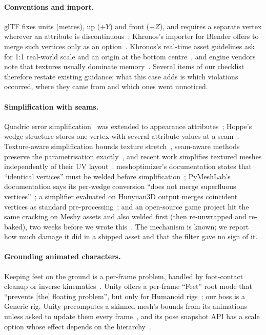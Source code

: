 \paragraph{Conventions and import.} glTF fixes units (metres), up ($+Y$) and front
($+Z$), and requires a separate vertex wherever an attribute is
discontinuous~\cite{khronos2021gltf}; Khronos's importer for Blender offers to
merge such vertices only as an option~\cite{khronos_blenderio}. Khronos's
real-time asset guidelines ask for 1:1 real-world scale and an origin at the
bottom centre~\cite{khronos3dc2025guidelines}, and engine vendors note that
textures usually dominate memory~\cite{unity_mobileart}. Several items of our
checklist therefore restate existing guidance; what this case adds is which
violations occurred, where they came from and which ones went unnoticed.

\paragraph{Simplification with seams.} Quadric error
simplification~\cite{garland1997qem} was extended to appearance
attributes~\cite{garland1998colorqem,hoppe1999newqem}; Hoppe's wedge structure
stores one vertex with several attribute values at a seam~\cite{hoppe1999newqem}.
Texture-aware simplification bounds texture
stretch~\cite{sander2001tmpm}, seam-aware methods preserve the parametrisation
exactly~\cite{liu2017seamless}, and recent work simplifies
textured meshes independently of their UV layout~\cite{liu2025wild}.
meshoptimizer's documentation states that ``identical vertices'' must be welded
before simplification~\cite{meshopt}; PyMeshLab's documentation says its
per-wedge conversion ``does not merge superfluous vertices''~\cite{pymeshlabdocs};
a simplifier evaluated on Hunyuan3D output merges coincident vertices as
standard pre-processing~\cite{bhosikar2026faqem}; and an open-source game project
hit the same cracking on Meshy assets and also welded first (then re-unwrapped
and re-baked), two weeks before we wrote this~\cite{galashots2026weld}. The mechanism is known;
we report how much damage it did in a shipped asset and that the filter gave no
sign of it.

\paragraph{Grounding animated characters.} Keeping feet on the ground is a
per-frame problem, handled by foot-contact cleanup or inverse
kinematics~\cite{kovar2002footskate}. Unity offers a per-frame ``Feet'' root mode
that ``prevents [the] floating problem'', but only for Humanoid
rigs~\cite{unity_rootmotion}; our boss is a Generic rig. Unity precomputes a skinned
mesh's bounds from its animations unless asked to update them every
frame~\cite{unity_localbounds}, and its pose snapshot API has a scale option whose
effect depends on the hierarchy~\cite{unity_bakemesh}.
